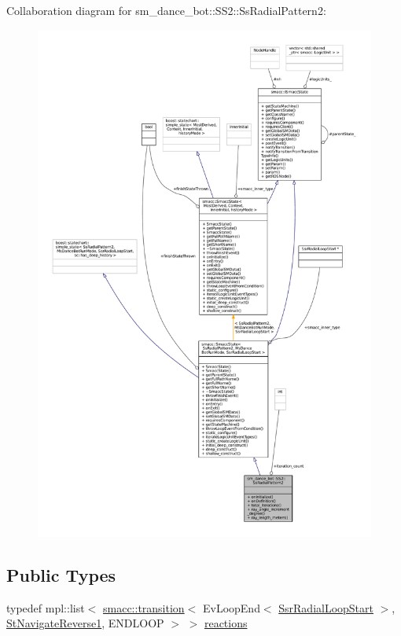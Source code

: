 Collaboration diagram for sm\+\_\+dance\+\_\+bot\+:\+:S\+S2\+:\+:Ss\+Radial\+Pattern2\+:
\nopagebreak
\begin{figure}[H]
\begin{center}
\leavevmode
\includegraphics[width=350pt]{structsm__dance__bot_1_1SS2_1_1SsRadialPattern2__coll__graph}
\end{center}
\end{figure}
\subsection*{Public Types}
\begin{DoxyCompactItemize}
\item 
typedef mpl\+::list$<$ \hyperlink{classsmacc_1_1transition}{smacc\+::transition}$<$ Ev\+Loop\+End$<$ \hyperlink{structsm__dance__bot_1_1radial__motion_1_1SsrRadialLoopStart}{Ssr\+Radial\+Loop\+Start} $>$, \hyperlink{structsm__dance__bot_1_1StNavigateReverse1}{St\+Navigate\+Reverse1}, E\+N\+D\+L\+O\+OP $>$ $>$ \hyperlink{structsm__dance__bot_1_1SS2_1_1SsRadialPattern2_a8eebdfef76e9650546653ddc48e9bfe5}{reactions}
\end{DoxyCompactItemize}

